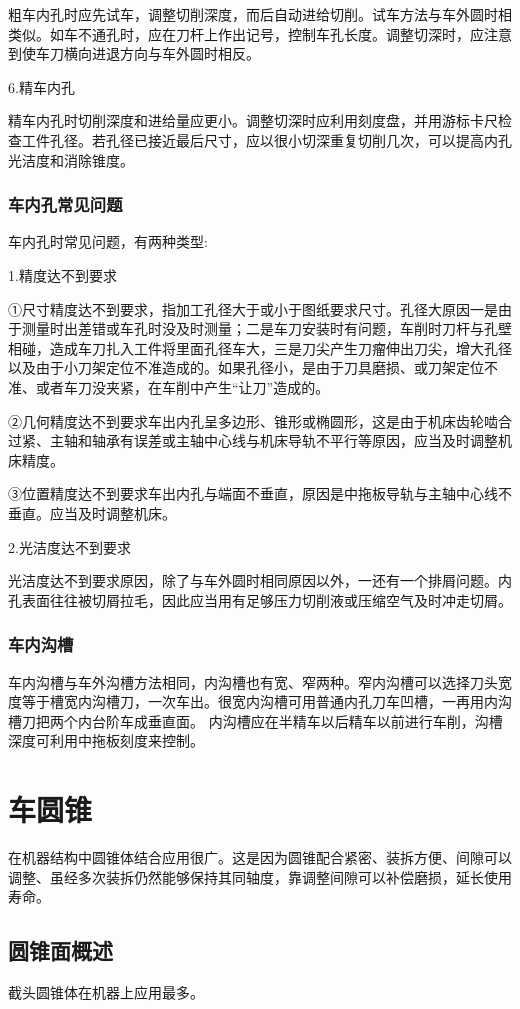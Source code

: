 \documentclass{ctexbook}
\begin{document}
粗车内孔时应先试车，调整切削深度，而后自动进给切削。试车方法与车外圆时相类似。如车不通孔时，应在刀杆上作出记号，控制车孔长度。调整切深时，应注意到使车刀横向进退方向与车外圆时相反。

6.精车内孔

精车内孔时切削深度和进给量应更小。调整切深时应利用刻度盘，并用游标卡尺检查工件孔径。若孔径已接近最后尺寸，应以很小切深重复切削几次，可以提高内孔光洁度和消除锥度。
\subsubsection{车内孔常见问题}
车内孔时常见问题，有两种类型:

1.精度达不到要求

①尺寸精度达不到要求，指加工孔径大于或小于图纸要求尺寸。孔径大原因一是由于测量时出差错或车孔时没及时测量；二是车刀安装时有问题，车削时刀杆与孔壁相碰，造成车刀扎入工件将里面孔径车大，三是刀尖产生刀瘤伸出刀尖，增大孔径以及由于小刀架定位不准造成的。如果孔径小，是由于刀具磨损、或刀架定位不准、或者车刀没夹紧，在车削中产生“让刀”造成的。

②几何精度达不到要求车出内孔呈多边形、锥形或椭圆形，这是由于机床齿轮啮合过紧、主轴和轴承有误差或主轴中心线与机床导轨不平行等原因，应当及时调整机床精度。

③位置精度达不到要求车出内孔与端面不垂直，原因是中拖板导轨与主轴中心线不垂直。应当及时调整机床。

2.光洁度达不到要求

光洁度达不到要求原因，除了与车外圆时相同原因以外，一还有一个排屑问题。内孔表面往往被切屑拉毛，因此应当用有足够压力切削液或压缩空气及时冲走切屑。
\subsubsection{车内沟槽}
车内沟槽与车外沟槽方法相同，内沟槽也有宽、窄两种。窄内沟槽可以选择刀头宽度等于槽宽内沟槽刀，一次车出。很宽内沟槽可用普通内孔刀车凹槽，一再用内沟槽刀把两个内台阶车成垂直面。
内沟槽应在半精车以后精车以前进行车削，沟槽深度可利用中拖板刻度来控制。
\section{车圆锥}
在机器结构中圆锥体结合应用很广。这是因为圆锥配合紧密、装拆方便、间隙可以调整、虽经多次装拆仍然能够保持其同轴度，靠调整间隙可以补偿磨损，延长使用寿命。
\subsection{圆锥面概述}
截头圆锥体在机器上应用最多。
\end{document}
